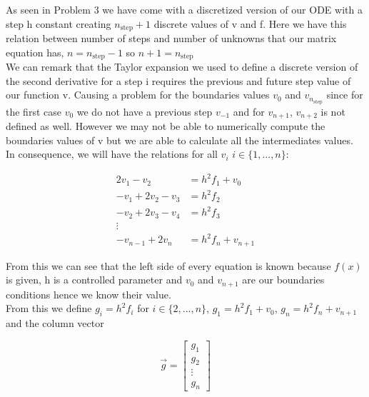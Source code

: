 \documentclass[a4paper,10pt,english]{article}
\begin{document}


\section{} %

As seen in Problem 3 we have come with a discretized version of our ODE with a
step h constant creating $n_{\text{step}} + 1$ discrete values of v and f. 
Here we have this relation between number of steps and number of unknowns that our matrix
equation has, $n = n_{\text{step}} - 1$ so $n + 1 = n_{\text{step}}$\\

We can remark that the Taylor expansion we used to define a discrete version of
the second derivative for a step i requires the previous and future step value
of our function v. Causing a problem for the boundaries values $v_0$ and 
$v_{n_{\text{step}}}$ since for the first case $v_0$ we do not have a previous step $v_{-1}$
and for $v_{n + 1}$, $v_{n + 2}$ is not defined as well. However we
may not be able to numerically compute the boundaries values of v but we are able to
calculate all the intermediates values. \\

In consequence, we will have the relations for all $v_i$ $i \in \{1, ..., n\}$:

\begin{align*}
    2v_1 - v_2 &= h^2f_1 + v_0 \\
    -v_1 + 2v_2 - v_3 &= h^2f_2 \\
    -v_2 + 2v_3 - v_4 &= h^2f_3 \\
    \vdots \\
    -v_{n-1} + 2v_{n} &= h^2f_{n} + v_{n + 1}   
\end{align*}

From this we can see that the left side of every equation is known because
$f(x)$ is given, h is a controlled parameter and $v_0$ and $v_{n + 1}$ are our
boundaries conditions hence we know their value. \\
From this we define $g_i = h^2f_i$ for $i \in \{ 2, ... , n\}$, $g_1 = h^2f_1 + v_0$, $g_{n} = h^2 f_{n} + v_{n + 1}$ and the column vector 


\begin{equation*}
    \vec{g}=\begin{bmatrix}
    g_1 \\
    g_2 \\
    \vdots \\
    g_{n}
\end{bmatrix}
\end{equation*}
\end{document}
